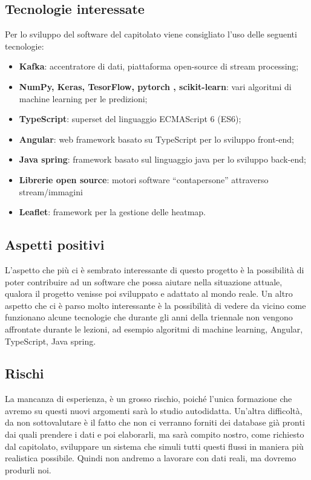 \documentclass[../studio-di-fattibilita.tex]{subfiles}
\begin{document}
\subsection{Tecnologie interessate}%
\label{sub:tecnologie_interessate}
Per lo sviluppo del software del capitolato viene consigliato l’uso delle seguenti tecnologie:
\begin{itemize}
  \item \textbf{Kafka}: accentratore di dati, piattaforma open-source di stream processing;
  \item \textbf{NumPy, Keras, TesorFlow, pytorch , scikit-learn}: vari algoritmi di machine learning per le predizioni;
  \item \textbf{TypeScript}: superset del linguaggio ECMAScript 6 (ES6);
  \item \textbf{Angular}: web framework basato su TypeScript per lo sviluppo front-end;
  \item \textbf{Java spring}: framework basato sul linguaggio java per lo sviluppo back-end;
  \item \textbf{Librerie open source}: motori software “contapersone” attraverso stream/immagini
  \item \textbf{Leaflet}: framework per la gestione delle heatmap.
\end{itemize}

\subsection{Aspetti positivi}%
\label{sub:aspetti_positivi}
L’aspetto che più ci è sembrato interessante di questo progetto è la possibilità di poter contribuire ad un software che possa aiutare nella situazione attuale, qualora il progetto venisse poi sviluppato e adattato al mondo reale. Un altro aspetto che ci è parso molto interessante è la possibilità di vedere da vicino come funzionano alcune tecnologie che durante gli anni della triennale non vengono affrontate durante le lezioni, ad esempio algoritmi di machine learning, Angular, TypeScript, Java spring.

\subsection{Rischi}%
\label{sub:rischi}
La mancanza di esperienza, è un grosso rischio, poiché l’unica formazione che avremo su questi nuovi argomenti sarà lo studio autodidatta. Un’altra difficoltà, da non sottovalutare è il fatto che non ci verranno forniti dei database già pronti dai quali prendere i dati e poi elaborarli, ma sarà compito nostro, come richiesto dal capitolato, sviluppare un sistema che simuli tutti questi flussi in maniera più realistica possibile. Quindi non andremo a lavorare con dati reali, ma dovremo produrli noi.
\end{document}
